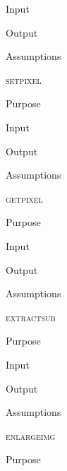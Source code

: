 \documentclass[pdftex, 11pt]{article}
\begin{document}
\begin{description}
\begin{description}
			\item{Input}


			\item{Output}


			\item{Assumptions}


		\end{description}



	\item{\textsc{setpixel}}
		\begin{description}
			\item{Purpose}


			\item{Input}


			\item{Output}


			\item{Assumptions}


		\end{description}



	\item{\textsc{getpixel}}
		\begin{description}
			\item{Purpose}


			\item{Input}


			\item{Output}


			\item{Assumptions}


		\end{description}



	\item{\textsc{extractsub}}
		\begin{description}
			\item{Purpose}


			\item{Input}


			\item{Output}


			\item{Assumptions}


		\end{description}



	\item{\textsc{enlargeimg}}
		\begin{description}
			\item{Purpose}



\end{description}
\end{description}
\end{document}
